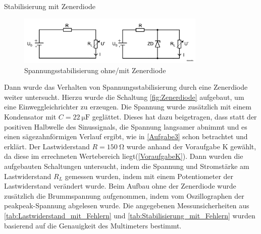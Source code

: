 \documentclass{article}
\theoremstyle{definition}
\begin{document}
\begin{aufgabe}{Stabilisierung mit Zenerdiode}
    

\begin{figure}[H]
             \centering
             \includegraphics[width=0.8\textwidth]{figs/fig2_11.png}
             \caption{Spannungsstabilisierung ohne/mit Zenerdiode \cite{anleitung}}
             \label{fig:Zenerdiode}
         \end{figure}

Dann wurde das Verhalten von Spannungsstabilisierung durch eine Zenerdiode weiter untersucht. Hierzu wurde die Schaltung 
\autoref{fig:Zenerdiode} aufgebaut, um eine Einweggleichrichter zu erzeugen. Die Spannung wurde zusätzlich mit einem Kondensator
 mit $C= \SI{22}{\micro \farad}$ geglättet. Dieses hat dazu beigetragen, dass statt der positiven Halbwelle des Sinussignals, die 
 Spannung langsamer abnimmt und es einen sägezahnförmigen Verlauf ergibt, wie in \autoref{Aufgabe3} schon betrachtet 
 und erklärt.
Der Lastwiderstand $R= \SI{150}{\ohm}$ wurde anhand der Voraufgabe K gewählt, da diese im errechneten Wertebereich 
liegt(\autoref{VoraufgabeK}). Dann wurden die aufgebauten Schaltungen untersucht, indem die Spannung und Stromstärke am 
Lastwiderstand $R_L$ gemessen wurden, indem mit einem Potentiometer der Lastwiderstand verändert wurde. Beim Aufbau ohne 
der Zenerdiode wurde zusätzlich die Brummspannung aufgenommen, indem vom Oszillographen der peakpeak-Spannung abgelesen wurde. 
Die angegebenen Messunsicherheiten aus \autoref{tab:Lastwiderstand_mit_Fehlern} und \autoref{tab:Stabilisierung_mit_Fehlern} wurden 
basierend auf die Genauigkeit des Multimeters bestimmt. \cite{m2005-multimeter}


\end{aufgabe}
\end{document}
